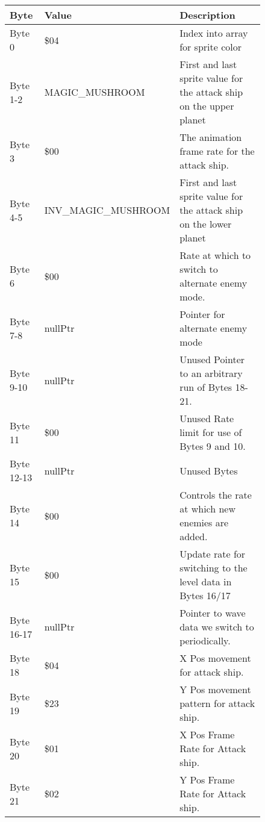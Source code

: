 \begin{figure}[H]
{\begin{adjustbox}{width=12cm}
\begin{tabular}{lll}
\toprule
 Byte       & Value                     & Description                                                         \\
\midrule
 Byte 0     & \$04                       & Index into array for sprite color                                   \\
 Byte 1-2   & MAGIC\_MUSHROOM            & First and last sprite value for the attack ship on the upper planet \\
 Byte 3     & \$00                       & The animation frame rate for the attack ship.                       \\
 Byte 4-5   & INV\_MAGIC\_MUSHROOM        & First and last sprite value for the attack ship on the lower planet \\
 Byte 6     & \$00                       & Rate at which to switch to alternate enemy mode.                    \\
 Byte 7-8   & nullPtr                   & Pointer for alternate enemy mode                                    \\
 Byte 9-10  & nullPtr                   & Unused Pointer to an arbitrary run of Bytes 18-21.                  \\
 Byte 11    & \$00                       & Unused Rate limit for use of Bytes 9 and 10.                        \\
 Byte 12-13 & nullPtr                   & Unused Bytes                                                        \\
 Byte 14    & \$00                       & Controls the rate at which new enemies are added.                   \\
 Byte 15    & \$00                       & Update rate for switching to the level data in Bytes 16/17          \\
 Byte 16-17 & nullPtr                   & Pointer to wave data we switch to periodically.                     \\
 Byte 18    & \$04                       & X Pos movement for attack ship.                                     \\
 Byte 19    & \$23                       & Y Pos movement pattern for attack ship.                             \\
 Byte 20    & \$01                       & X Pos Frame Rate for Attack ship.                                   \\
 Byte 21    & \$02                       & Y Pos Frame Rate for Attack ship.                                   \\

\end{tabular}
\end{adjustbox}}
\end{figure}
